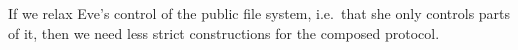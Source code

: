If we relax Eve's control of the public file system, i.e.\ that she only 
controls parts of it, then we need less strict constructions for the composed 
protocol.

%
%
%
%
%
%
%

